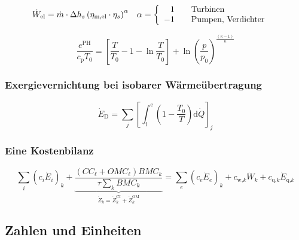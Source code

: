 \begin{align}
\dot W_\text{el} &= \dot m \cdot \Delta h_s \left(\eta_\text{m,el} \cdot \eta_s\right)^\alpha &
\alpha &= \left\{
\begin{array}{r l}
1 & \quad \text{Turbinen}\\
-1 & \quad \text{Pumpen, Verdichter}
\end{array}
\right.
\end{align}

\begin{equation}
\frac{e^\text{PH}}{c_\text{p}T_0}=\left[\frac{T}{T_0}-1-\ln\frac{T}{T_0}\right]+\ln\left(\frac{p}{p_0}\right)^{\frac{\left(\kappa-1\right)}{\kappa}}
\end{equation}

\subsubsection{Exergievernichtung bei isobarer Wärmeübertragung}
\begin{equation}
\dot E_\text{D}=\sum\limits_j\left[\int_\text{i}^\text{e}\left(1-\frac{T_0}{T}\right)\text{d}\dot Q\right]_j	
\label{eq:ed_he}
\end{equation}

\subsubsection{Eine Kostenbilanz}
\begin{equation}
\sum_i{\left(c_i\dot E_i\right)_k} + \underbrace{\frac{\left(CC_\ell+OMC_\ell\right) BMC_k}{\tau \sum_k{BMC_k}}}_{\dot Z_k=\dot Z_k^\text{CI}+\dot Z_k^\text{OM}}
=\sum_e{\left(c_e\dot E_e\right)_k} + c_{\text{w,}k} \dot W_k + c_{\text{q,}k}\dot E_{\text{q,}k}
\label{eq:cost_balance}
\end{equation}

\subsection{Zahlen und Einheiten}
\label{sec:latex-zahlen-einheiten}

